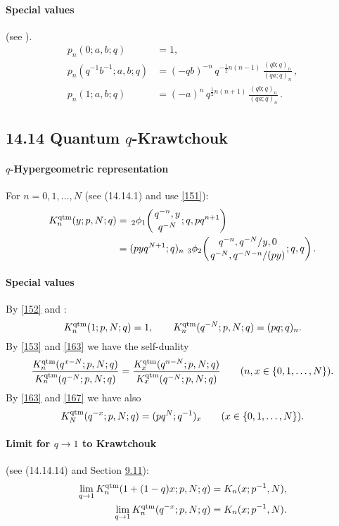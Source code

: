 \documentclass[twoside,11pt]{article}
\newcommand\half{\frac12}
\newcommand{\qhyp}[5]{\,\mbox{}_{#1}\phi_{#2}\!\left(
  \genfrac{}{}{0pt}{}{#3}{#4};#5\right)}
\begin{document}
\paragraph{Special values}
(see \cite[\S2.4]{K17}).
\begin{align}
p_n(0;a,b;q)&=1,\label{127}\\
p_n(q^{-1}b^{-1};a,b;q)&=(-qb)^{-n}\,q^{-\half n(n-1)}\,\frac{(qb;q)_n}{(qa;q)_n}\,,\label{128}\\
p_n(1;a,b;q)&=(-a)^n\,q^{\half n(n+1)}\,\frac{(qb;q)_n}{(qa;q)_n}\,.\label{129}
\end{align}
%
\subsection*{14.14 Quantum $q$-Krawtchouk}
\label{sec14.14}
%
\paragraph{$q$-Hypergeometric representation}
For $n=0,1,\ldots,N$
(see (14.14.1) and use \eqref{151}):
\begin{align}
K_n^{\rm qtm}(y;p,N;q)
&=\qhyp21{q^{-n},y}{q^{-N}}{q,pq^{n+1}}
\label{152}\\
&=(pyq^{N+1};q)_n\,
\qhyp32{q^{-n},q^{-N}/y,0}{q^{-N},q^{-N-n}/(py)}{q,q}.
\label{153}
\end{align}
%
\paragraph{Special values}
By \eqref{152} and :
\begin{equation}
K_n^{\rm qtm}(1;p,N;q)=1,\qquad
K_n^{\rm qtm}(q^{-N};p,N;q)=(pq;q)_n.
\label{163}
\end{equation}
By \eqref{153} and \eqref{163} we have the self-duality
\begin{equation}
\frac{K_n^{\rm qtm}(q^{x-N};p,N;q)}{K_n^{\rm qtm}(q^{-N};p,N;q)}
=\frac{K_x^{\rm qtm}(q^{n-N};p,N;q)}{K_x^{\rm qtm}(q^{-N};p,N;q)}\qquad
(n,x\in\{0,1,\ldots,N\}).
\label{167}
\end{equation}
By \eqref{163} and \eqref{167} we have also
\begin{equation}
K_N^{\rm qtm}(q^{-x};p,N;q)=(pq^N;q^{-1})_x\qquad(x\in\{0,1,\ldots,N\}).
\label{169}
\end{equation}
%
\paragraph{Limit for $q\to1$ to Krawtchouk} (see (14.14.14) and Section \hyperref[sec9.11]{9.11}):
\begin{align}
\lim_{q\to1} K_n^{\rm qtm}(1+(1-q)x;p,N;q)&=K_n(x;p^{-1},N),
\label{161}\\
\lim_{q\to1} K_n^{\rm qtm}(q^{-x};p,N;q)&=K_n(x;p^{-1},N).
\label{164}
\end{align}
%
\end{document}
